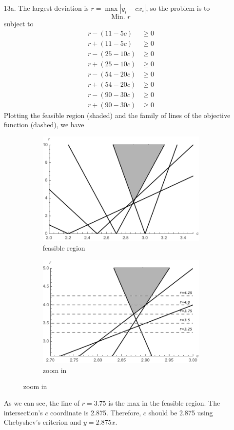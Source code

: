 \documentclass[10pt]{report}
\begin{document}
\begin{enumerate}
	\item [13a.]
	The largest deviation is $r = \max |y_i - c x_i|$, so the problem is to
	\[
	\text{Min. } r
	\]
	subject to
	\begin{align*}
		r - (11-5c) &\ge 0\\
		r + (11-5c) &\ge 0\\
		r - (25-10c) &\ge 0\\
		r + (25-10c) &\ge 0\\
		r - (54-20c) &\ge 0\\
		r + (54-20c) &\ge 0\\
		r - (90-30c) &\ge 0\\
		r + (90-30c) &\ge 0
	\end{align*}
	Plotting the feasible region (shaded) and the family of lines of the objective function (dashed), we have 
	\begin{figure}[H]
		\centering
		\begin{subfigure}[b]{.4\linewidth}
			\caption{feasible region}
			\includegraphics[width=\linewidth]{7-2/13a.png}
		\end{subfigure}
		\hspace{4ex}
		\begin{subfigure}[b]{.4\linewidth}
			\caption{zoom in}
			\includegraphics[width=\linewidth]{7-2/13azoom.png}
		\end{subfigure}
	\end{figure}
	As we can see, the line of $r = 3.75$ is the max in the feasible region. The intersection's $c$ coordinate is 2.875. Therefore, $c$ should be 2.875 using Chebyshev's criterion and $y=2.875x$.
	

\end{enumerate}
\end{document}
